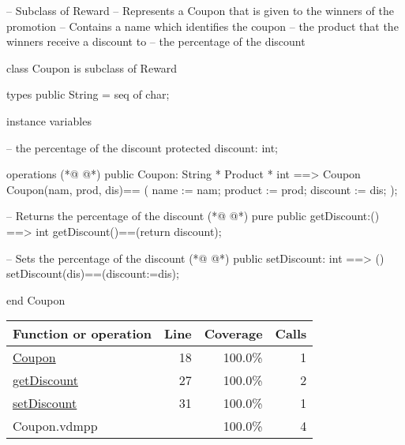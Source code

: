 \begin{vdmpp}[breaklines=true]
-- Subclass of Reward
-- Represents a Coupon that is given to the winners of the promotion
-- Contains a name which identifies the coupon
--      the product that the winners receive a discount to
--          the percentage of the discount

class Coupon is subclass of Reward

  types
  public String = seq of char;
  
 instance variables
 
   -- the percentage of the discount
    protected discount: int;
    
  operations 
(*@
\label{Coupon:18}
@*)
   public Coupon: String * Product * int ==> Coupon
     Coupon(nam, prod, dis)==
     (
     name := nam;
     product := prod;
     discount := dis;
     );
     
   -- Returns the percentage of the discount        
(*@
\label{getDiscount:27}
@*)
   pure public getDiscount:() ==> int
   getDiscount()==(return discount);
   
   -- Sets the percentage of the discount    
(*@
\label{setDiscount:31}
@*)
   public setDiscount: int ==> ()
  setDiscount(dis)==(discount:=dis);
     
end Coupon
\end{vdmpp}
\bigskip
\begin{longtable}{|l|r|r|r|}
\hline
Function or operation & Line & Coverage & Calls \\
\hline
\hline
\hyperref[Coupon:18]{Coupon} & 18&100.0\% & 1 \\
\hline
\hyperref[getDiscount:27]{getDiscount} & 27&100.0\% & 2 \\
\hline
\hyperref[setDiscount:31]{setDiscount} & 31&100.0\% & 1 \\
\hline
\hline
Coupon.vdmpp & & 100.0\% & 4 \\
\hline
\end{longtable}

